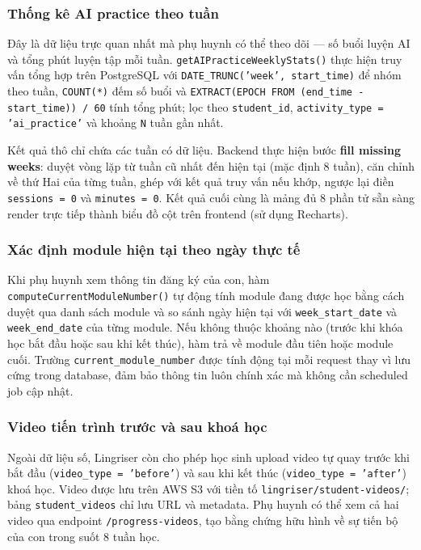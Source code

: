 \subsubsection{Thống kê AI practice theo tuần}

Đây là dữ liệu trực quan nhất mà phụ huynh có thể theo dõi — số buổi luyện AI và tổng phút luyện tập mỗi tuần. \texttt{getAIPracticeWeeklyStats()} thực hiện truy vấn tổng hợp trên PostgreSQL với \texttt{DATE\_TRUNC('week', start\_time)} để nhóm theo tuần, \texttt{COUNT(*)} đếm số buổi và \texttt{EXTRACT(EPOCH FROM (end\_time - start\_time)) / 60} tính tổng phút; lọc theo \texttt{student\_id}, \texttt{activity\_type = 'ai\_practice'} và khoảng \texttt{N} tuần gần nhất.

Kết quả thô chỉ chứa các tuần có dữ liệu. Backend thực hiện bước \textbf{fill missing weeks}: duyệt vòng lặp từ tuần cũ nhất đến hiện tại (mặc định 8 tuần), căn chỉnh về thứ Hai của từng tuần, ghép với kết quả truy vấn nếu khớp, ngược lại điền \texttt{sessions = 0} và \texttt{minutes = 0}. Kết quả cuối cùng là mảng đủ 8 phần tử sẵn sàng render trực tiếp thành biểu đồ cột trên frontend (sử dụng Recharts).

\subsubsection{Xác định module hiện tại theo ngày thực tế}

Khi phụ huynh xem thông tin đăng ký của con, hàm \texttt{computeCurrentModuleNumber()} tự động tính module đang được học bằng cách duyệt qua danh sách module và so sánh ngày hiện tại với \texttt{week\_start\_date} và \texttt{week\_end\_date} của từng module. Nếu không thuộc khoảng nào (trước khi khóa học bắt đầu hoặc sau khi kết thúc), hàm trả về module đầu tiên hoặc module cuối. Trường \texttt{current\_module\_number} được tính động tại mỗi request thay vì lưu cứng trong database, đảm bảo thông tin luôn chính xác mà không cần scheduled job cập nhật.

\subsubsection{Video tiến trình trước và sau khoá học}

Ngoài dữ liệu số, Lingriser còn cho phép học sinh upload video tự quay trước khi bắt đầu (\texttt{video\_type = 'before'}) và sau khi kết thúc (\texttt{video\_type = 'after'}) khoá học. Video được lưu trên AWS S3 với tiền tố \texttt{lingriser/student-videos/}; bảng \texttt{student\_videos} chỉ lưu URL và metadata. Phụ huynh có thể xem cả hai video qua endpoint \texttt{/progress-videos}, tạo bằng chứng hữu hình về sự tiến bộ của con trong suốt 8 tuần học.

